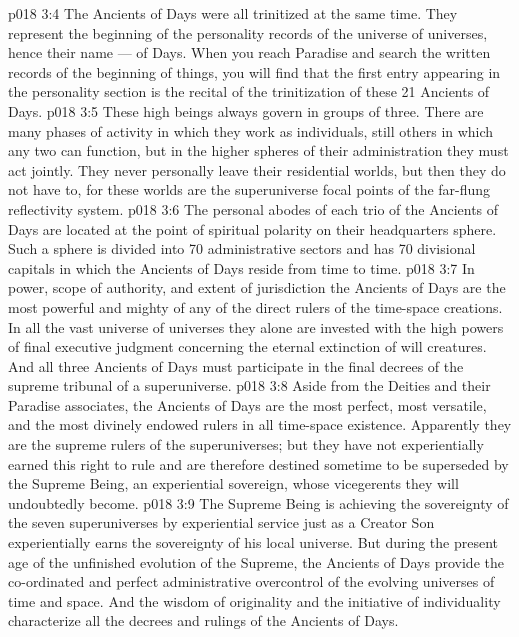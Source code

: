 \vs p018 3:4 \pc The Ancients of Days were all trinitized at the same time. They represent the beginning of the personality records of the universe of universes, hence their name ---  of Days. When you reach Paradise and search the written records of the beginning of things, you will find that the first entry appearing in the personality section is the recital of the trinitization of these 21 Ancients of Days.
\vs p018 3:5 \pc These high beings always govern in groups of three. There are many phases of activity in which they work as individuals, still others in which any two can function, but in the higher spheres of their administration they must act jointly. They never personally leave their residential worlds, but then they do not have to, for these worlds are the superuniverse focal points of the far\hyp{}flung reflectivity system.
\vs p018 3:6 The personal abodes of each trio of the Ancients of Days are located at the point of spiritual polarity on their headquarters sphere. Such a sphere is divided into 70 administrative sectors and has 70 divisional capitals in which the Ancients of Days reside from time to time.
\vs p018 3:7 In power, scope of authority, and extent of jurisdiction the Ancients of Days are the most powerful and mighty of any of the direct rulers of the time\hyp{}space creations. In all the vast universe of universes they alone are invested with the high powers of final executive judgment concerning the eternal extinction of will creatures. And all three Ancients of Days must participate in the final decrees of the supreme tribunal of a superuniverse.
\vs p018 3:8 \pc Aside from the Deities and their Paradise associates, the Ancients of Days are the most perfect, most versatile, and the most divinely endowed rulers in all time\hyp{}space existence. Apparently they are the supreme rulers of the superuniverses; but they have not experientially earned this right to rule and are therefore destined sometime to be superseded by the Supreme Being, an experiential sovereign, whose vicegerents they will undoubtedly become.
\vs p018 3:9 The Supreme Being is achieving the sovereignty of the seven superuniverses by experiential service just as a Creator Son experientially earns the sovereignty of his local universe. But during the present age of the unfinished evolution of the Supreme, the Ancients of Days provide the co\hyp{}ordinated and perfect administrative overcontrol of the evolving universes of time and space. And the wisdom of originality and the initiative of individuality characterize all the decrees and rulings of the Ancients of Days.
